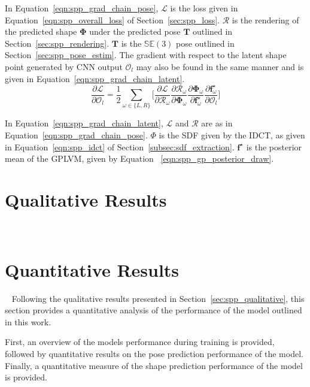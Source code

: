 In Equation~\ref{eqn:spp_grad_chain_pose}, \( \mathcal{L} \) is the loss given in Equation~\ref{eqn:spp_overall_loss}%
of Section~\ref{sec:spp_loss}. \( \mathcal{R} \) is the rendering of the predicted shape \( \bm{\Phi} \) under the 
predicted pose \( \bm{T} \) outlined in Section~\ref{sec:spp_rendering}. \( \bm{T} \) is the 
\( \mathbb{SE}(3) \) pose outlined in Section~\ref{sec:spp_pose_estim}. The gradient with respect 
to the latent shape point generated by CNN output \( \mathcal{O}_{l} \) may also be found in the same 
manner and is given in Equation~\ref{eqn:spp_grad_chain_latent}.
\begin{equation}
  \label{eqn:spp_grad_chain_latent}
  \frac{\partial \mathcal{L}}{\partial \mathcal{O}_{l}} = 
  \frac{1}{2} \sum_{\omega \in \{L, R\}} \Bigg[
    \frac{\partial \mathcal{L}}{\partial \mathcal{R}_{\omega}}
    \frac{\partial \mathcal{R}_{\omega}}{\partial \mathcal{\bm{\Phi}}_{\omega}}
    \frac{\partial \bm{\Phi}_{\omega}}{\partial \bm{f}^{\star}_{\omega}}
    \frac{\partial \bm{f}^{\star}_{\omega}}{\partial \mathcal{O}_{l}}
  \Bigg]
\end{equation}

In Equation~\ref{eqn:spp_grad_chain_latent}, \( \mathcal{L} \) and \( \mathcal{R} \) 
are as in Equation~\ref{eqn:spp_grad_chain_pose}. \( \Phi \) is the SDF given by the IDCT, 
as given in Equation~\ref{eqn:spp_idct} of Section~\ref{subsec:sdf_extraction}. 
\( \bm{f}^{\star} \) is the posterior mean of the GPLVM, given by Equation
~\ref{eqn:spp_gp_posterior_draw}.

\section{Qualitative Results}
~\label{sec:spp_qualitative}

\section{Quantitative Results}
~\label{sec:spp_quantitative}
Following the qualitative results presented in Section~\ref{sec:spp_qualitative}, this section 
provides a quantitative analysis of the performance of the model outlined in this work.

First, an overview of the models performance during training is provided, followed by quantitative 
results on the pose prediction performance of the model. Finally, a quantitative measure of the 
shape prediction performance of the model is provided.

